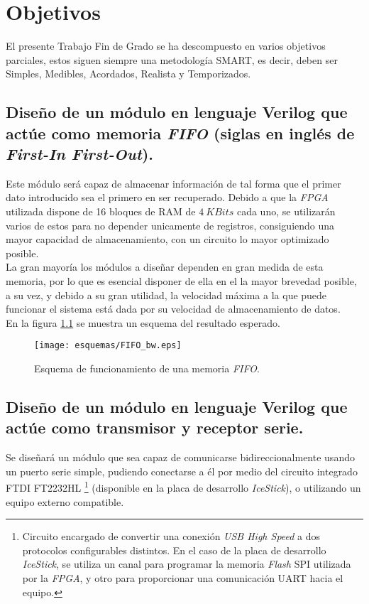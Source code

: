\chapter{Objetivos}
\label{ch:objetivos}




El presente Trabajo Fin de Grado se ha descompuesto en varios objetivos parciales, estos siguen siempre una metodología SMART, es decir, deben ser Simples, Medibles, Acordados, Realista y Temporizados.

\section{Diseño de un módulo en lenguaje Verilog que actúe como memoria \emph{FIFO} (siglas en inglés de \emph{First-In First-Out}).}
Este módulo será capaz de almacenar información de tal forma que el primer dato introducido sea el primero en ser recuperado. Debido a que la \emph{FPGA} utilizada dispone de 16 bloques de RAM de $4~KBits$ cada uno, se utilizarán varios de estos para no depender unicamente de registros, consiguiendo una mayor capacidad de almacenamiento, con un circuito lo mayor optimizado posible. \\
La gran mayoría los módulos a diseñar dependen en gran medida de esta memoria, por lo que es esencial disponer de ella en el la mayor brevedad posible, a su vez, y debido a su gran utilidad, la velocidad máxima a la que puede funcionar el sistema está dada por su velocidad de almacenamiento de datos. \\
En la figura \ref{fig:FIFO_info} se muestra un esquema del resultado esperado.

\begin{figure}[htb]
    \centering
    \texttt{[image: esquemas/FIFO\_bw.eps]}
    \caption{Esquema de funcionamiento de una memoria \emph{FIFO}.}
    \label{fig:FIFO_info}
\end{figure}

\section{Diseño de un módulo en lenguaje Verilog que actúe como transmisor y receptor serie.}
Se diseñará un módulo que sea capaz de comunicarse bidireccionalmente usando un puerto serie simple\cite{design-uart-vhdl}, pudiendo conectarse a él por medio del circuito integrado FTDI FT2232HL \footnote{Circuito encargado de convertir una conexión \emph{USB High Speed} a dos protocolos configurables distintos. En el caso de la placa de desarrollo \emph{IceStick}, se utiliza un canal para programar la memoria \emph{Flash} SPI utilizada por la \emph{FPGA}, y otro para proporcionar una comunicación UART hacia el equipo.} (disponible en la placa de desarrollo \emph{IceStick}\cite{icestickmanual}), o utilizando un equipo externo compatible.

